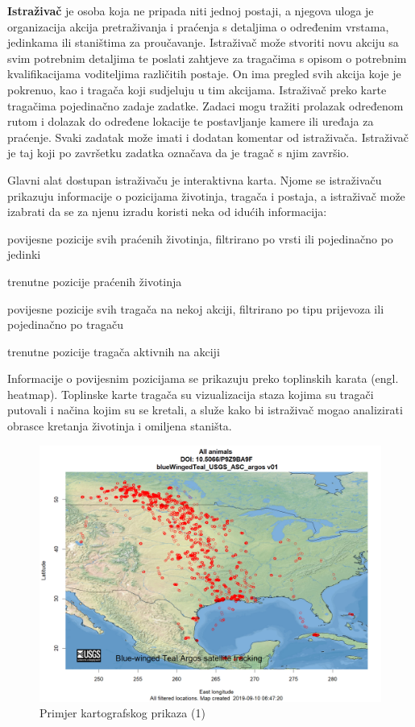 		\textbf{Istraživač} je osoba koja ne pripada niti jednoj postaji, a njegova uloga je organizacija akcija pretraživanja i praćenja s detaljima o određenim vrstama, jedinkama ili staništima za proučavanje. Istraživač može stvoriti novu akciju sa svim potrebnim detaljima te poslati zahtjeve za tragačima  s opisom o potrebnim kvalifikacijama voditeljima različitih postaje. On ima pregled svih akcija koje je pokrenuo, kao i tragača koji sudjeluju u tim akcijama. Istraživač preko karte tragačima pojedinačno zadaje zadatke. Zadaci mogu tražiti prolazak određenom rutom i dolazak do određene lokacije te postavljanje kamere ili uređaja za praćenje. Svaki zadatak može imati i dodatan komentar od istraživača. Istraživač je taj koji po završetku zadatka označava da je tragač s njim završio.
		
		Glavni alat dostupan istraživaču je interaktivna karta. Njome se istraživaču prikazuju informacije o pozicijama životinja, tragača i postaja, a istraživač može izabrati da se za njenu izradu koristi neka od idućih informacija: 
		
		\begin{packed_item}
			\item povijesne pozicije svih praćenih životinja, filtrirano po vrsti ili pojedinačno po jedinki 
			\item trenutne pozicije praćenih životinja
			\item povijesne pozicije svih tragača na nekoj akciji, filtrirano po tipu prijevoza ili pojedinačno po tragaču 
			\item trenutne pozicije tragača aktivnih na akciji
		\end{packed_item}
		
		Informacije o povijesnim pozicijama se prikazuju preko toplinskih karata (engl. heatmap). Toplinske karte tragača su vizualizacija staza kojima su tragači putovali i načina kojim su se kretali, a služe kako bi istraživač mogao analizirati obrasce kretanja životinja i omiljena staništa.
		
		\begin{figure}[H]
			\includegraphics[scale=0.4]{slike/map_tracking.PNG} %
			\centering
			\caption{Primjer kartografskog prikaza (1)}
			\label{fig:promjene}
		\end{figure}
		
